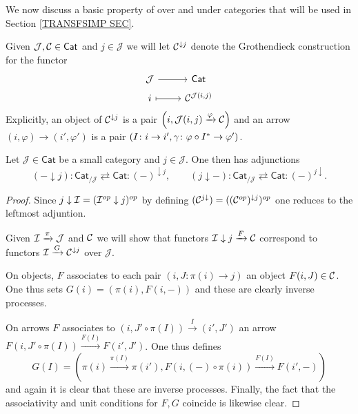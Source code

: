 \documentclass[a4paper,10pt]{article}%
\begin{document}
We now discuss a basic property of over and under categories that will be used in Section \ref{TRANSFSIMP SEC}.


Given $\mathcal{J},\mathcal{C} \in \mathsf{Cat}$ and $j \in \mathcal{J}$ we will let $\mathcal{C}^{ \downarrow j}$ denote the Grothendieck construction for the functor
\[
\begin{tikzcd}[row sep = 0.25em]
  \mathcal{J} \ar{r} & \mathsf{Cat} \\
  i \ar[mapsto]{r} & \C^{\mathcal{J}(i,j)}
\end{tikzcd}
\]
Explicitly, an object of $\mathcal{C}^{\downarrow j}$ is a pair
$\left(i,\mathcal{J}(i,j)\xrightarrow{\varphi} \mathcal{C}\right)$
and an arrow 
$(i,\varphi) \to (i',\varphi')$
is a pair
$(I \colon i \to i', 
\gamma \colon \varphi\circ I^{\**} \to \varphi')$.



\begin{lemma}\label{UNDERLEFTADJ LEM}
  Let $\mathcal{J} \in \mathsf{Cat}$ be a small category and 
  $j \in \mathcal{J}$. One then has adjunctions
  \[
  (\minus \downarrow j) 
  \colon
  \mathsf{Cat}_{/\mathcal{J}}
  \rightleftarrows
  \mathsf{Cat}
  \colon
  (\minus)^{\downarrow j},
  \qquad
  (j \downarrow \minus) 
  \colon
  \mathsf{Cat}_{/\mathcal{J}}
  \rightleftarrows
  \mathsf{Cat}
  \colon
  (\minus)^{j \downarrow}.
  \]
\end{lemma}

\begin{proof}
  Since $j \downarrow \mathcal{I} = (\mathcal{I}^{op} \downarrow j)^{op}$ by  defining $(\mathcal{C}^{j \downarrow}) = ((\mathcal{C}^{op})^{\downarrow j})^{op}$ one reduces to the leftmost adjuntion.

  Given $\mathcal{I} \xrightarrow{\pi} \mathcal{J}$ and $\mathcal{C}$ we will show that functors 
  $\mathcal{I} \downarrow j \xrightarrow{F} \mathcal{C}$
  correspond to functors
  $\mathcal{I} \xrightarrow{G} \mathcal{C}^{\downarrow j}$ over $\mathcal{J}$.
  
  On objects, $F$ associates to each pair 
  $(i,J\colon \pi(i) \to j)$ an object $F(i,J)\in \mathcal{C}$. One thus sets $G(i)=(\pi(i), F(i,\minus))$ and these are clearly inverse processes.

  On arrows $F$ associates to 
  $(i,J' \circ \pi(I)) \xrightarrow{I} (i',J')$ an arrow
  $F(i,J' \circ \pi(I)) \xrightarrow{F(I)} F(i',J')$.
  One thus defines
  \[
  G(I) = \left(
    \pi(i) \xrightarrow{\pi(I)} \pi(i'),
    F\left(i,(\minus)\circ \pi(i)\right)
    \xrightarrow{F(I)}
    F\left(i',\minus \right)
  \right)
  \]
  and again it is clear that these are inverse processes.
  Finally, the fact that the associativity and unit conditions for $F,G$ coincide is likewise clear.
\end{proof}
\end{document}
